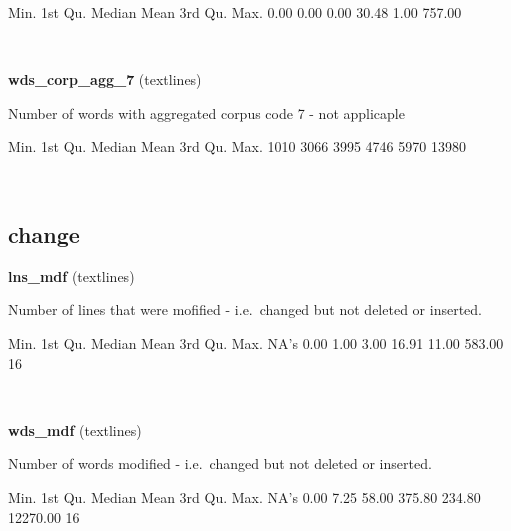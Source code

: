 \documentclass[]{article}
\newenvironment{Shaded}{\begin{snugshade}}{\end{snugshade}}
\newcommand{\DecValTok}[1]{\textcolor[rgb]{0.00,0.00,0.81}{{#1}}}
\newcommand{\FloatTok}[1]{\textcolor[rgb]{0.00,0.00,0.81}{{#1}}}
\newcommand{\StringTok}[1]{\textcolor[rgb]{0.31,0.60,0.02}{{#1}}}
\newcommand{\NormalTok}[1]{{#1}}
\begin{document}
\begin{Shaded}
\begin{Highlighting}[]
   \NormalTok{Min. 1st Qu.  Median    Mean 3rd Qu.    Max. }
   \FloatTok{0.00}    \FloatTok{0.00}    \FloatTok{0.00}   \FloatTok{30.48}    \FloatTok{1.00}  \FloatTok{757.00} 
\end{Highlighting}
\end{Shaded}

~

\vspace{1em}

\textbf{wds\_corp\_agg\_7} (textlines)

Number of words with aggregated corpus code 7 - not applicaple

\begin{Shaded}
\begin{Highlighting}[]
   \NormalTok{Min. 1st Qu.  Median    Mean 3rd Qu.    Max. }
   \DecValTok{1010}    \DecValTok{3066}    \DecValTok{3995}    \DecValTok{4746}    \DecValTok{5970}   \DecValTok{13980} 
\end{Highlighting}
\end{Shaded}

~

\vspace{1em}

\subsection{change}\label{change}

\textbf{lns\_mdf} (textlines)

Number of lines that were mofified - i.e.~changed but not deleted or
inserted.

\begin{Shaded}
\begin{Highlighting}[]
   \NormalTok{Min. 1st Qu.  Median    Mean 3rd Qu.    Max.    NA}\StringTok{'s }
\StringTok{   0.00    1.00    3.00   16.91   11.00  583.00      16 }
\end{Highlighting}
\end{Shaded}

~

\vspace{1em}

\textbf{wds\_mdf} (textlines)

Number of words modified - i.e.~changed but not deleted or inserted.

\begin{Shaded}
\begin{Highlighting}[]
    \NormalTok{Min.  1st Qu.   Median     Mean  3rd Qu.     Max.     NA}\StringTok{'s }
\StringTok{    0.00     7.25    58.00   375.80   234.80 12270.00       16 }
\end{Highlighting}
\end{Shaded}
\end{document}
